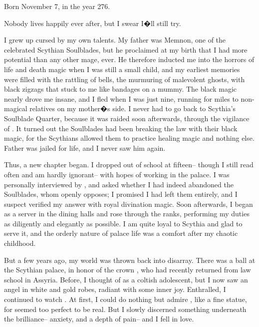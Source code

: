 \documentclass[char]{Kos}
\begin{document}
\name{\cButler{}}

Born November 7, in the year 276.

Nobody lives happily ever after, but I swear I�ll still try.

I grew up cursed by my own talents. My father was Memnon, one of the celebrated Scythian Soulblades, but he proclaimed at my birth that I had more potential than any other mage, ever. He therefore inducted me into the horrors of life and death magic when I was still a small child, and my earliest memories were filled with the rattling of bells, the murmuring of malevolent ghosts, with black zigzags that stuck to me like bandages on a mummy. The black magic nearly drove me insane, and I fled when I was just nine, running for miles to non-magical relatives on my mother�s side. I never had to go back to Scythia's Soulblade Quarter, because it was raided soon afterwards, through the vigilance of \cScythiaQueen{\Monarch} \cScythiaQueen{\nickname}. It turned out the Soulblades had been breaking the law with their black magic, for the Scythians allowed them to practice healing magic and nothing else. Father was jailed for life, and I never saw him again.

Thus, a new chapter began. I dropped out of school at fifteen-- though I still read often and am hardly ignorant-- with hopes of working in the palace. I was personally interviewed by\cScythiaQueen{\Monarch} \cScythiaQueen{\nickname}, and \cScythiaQueen{\they} asked whether I had indeed abandoned the Soulblades, whom \cScythiaQueen{\they} openly opposes; I promised I had left them entirely, and I suspect \cScythiaQueen{\they} verified my answer with royal divination magic. Soon afterwards, I began as a server in the dining halls and rose through the ranks, performing my duties as diligently and elegantly as possible. I am quite loyal to Scythia and glad to serve it, and the orderly nature of palace life was a comfort after my chaotic childhood.

But a few years ago, my world was thrown back into disarray. There was a ball at the Scythian palace, in honor of the crown \cBride{\prince} \cBride{\nickname}, who had recently returned from law school in Assyria. Before, I thought of \cBride{\them} as a coltish adolescent, but I now saw an angel in white and gold robes, radiant with some inner joy. Enthralled, I continued to watch \cBride{\them}. At first, I could do nothing but admire \cBride{\them}, like a fine statue, for \cBride{\they} seemed too perfect to be real. But I slowly discerned something underneath the brilliance-- anxiety, and a depth of pain-- and I fell in love. 
\end{document}
